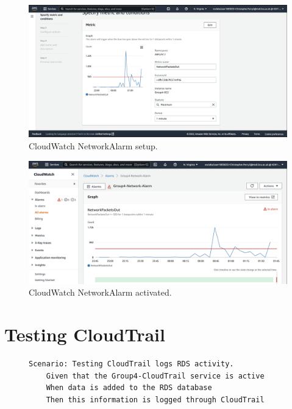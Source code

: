 \begin{figure}[!htbp]
    \centering
    \includegraphics[width=\textwidth]{resources/cloudwatch/cloudwatch-network-alarm-setup}
    \caption{CloudWatch NetworkAlarm setup.}
    \label{fig:cloudwatch-network-alarm-setup}
\end{figure}

\begin{figure}[!htbp]
    \centering
    \includegraphics[width=\textwidth]{resources/cloudwatch/cloudwatch-network-alarm-active}
    \caption{CloudWatch NetworkAlarm activated.}
    \label{fig:cloudwatch-network-alarm-active}
\end{figure}

\clearpage

\section{Testing CloudTrail}\label{sec:testing-cloudtrail}
\begin{figure}[!htbp]
    \centering
    \begin{verbatim}
Scenario: Testing CloudTrail logs RDS activity.
    Given that the Group4-CloudTrail service is active
    When data is added to the RDS database
    Then this information is logged through CloudTrail
    \end{verbatim}
    \label{fig:cloudtrail-test}
\end{figure}

